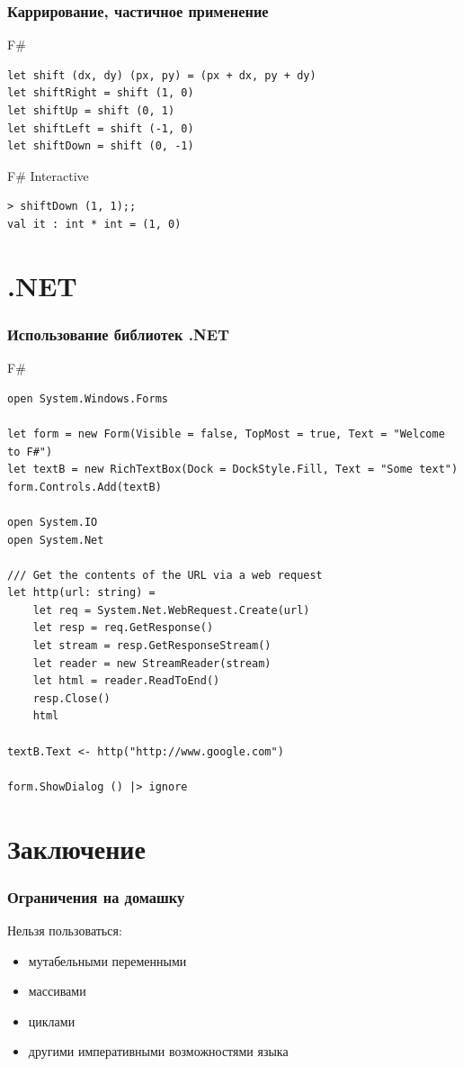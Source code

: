 \documentclass[xetex,mathserif,serif]{beamer}
\begin{document}
	\begin{frame}[fragile]
		\frametitle{Каррирование, частичное применение}
		\begin{exampleblock}{F\#}
			\begin{lstlisting}
let shift (dx, dy) (px, py) = (px + dx, py + dy)
let shiftRight = shift (1, 0)
let shiftUp = shift (0, 1)
let shiftLeft = shift (-1, 0)
let shiftDown = shift (0, -1)
            \end{lstlisting}
		\end{exampleblock}
		\begin{alertblock}{F\# Interactive}
			\begin{lstlisting}
> shiftDown (1, 1);;
val it : int * int = (1, 0)
            \end{lstlisting}
		\end{alertblock}
\end{frame}

	\section{.NET}

	\begin{frame}[fragile]
		\frametitle{Использование библиотек .NET}
		\begin{exampleblock}{F\#}
			\begin{lstlisting}[basicstyle=\ttfamily\tiny]
open System.Windows.Forms

let form = new Form(Visible = false, TopMost = true, Text = "Welcome to F#")
let textB = new RichTextBox(Dock = DockStyle.Fill, Text = "Some text")
form.Controls.Add(textB)

open System.IO
open System.Net

/// Get the contents of the URL via a web request
let http(url: string) =
    let req = System.Net.WebRequest.Create(url)
    let resp = req.GetResponse()
    let stream = resp.GetResponseStream()
    let reader = new StreamReader(stream)
    let html = reader.ReadToEnd()
    resp.Close()
    html

textB.Text <- http("http://www.google.com")

form.ShowDialog () |> ignore
           \end{lstlisting}
       \end{exampleblock}
\end{frame}

	\section{Заключение}

	\begin{frame}
		\frametitle{Ограничения на домашку}
		Нельзя пользоваться:
		\begin{itemize}
			\item мутабельными переменными
			\item массивами
			\item циклами
			\item другими императивными возможностями языка
		\end{itemize}
	\end{frame}
\end{document}
